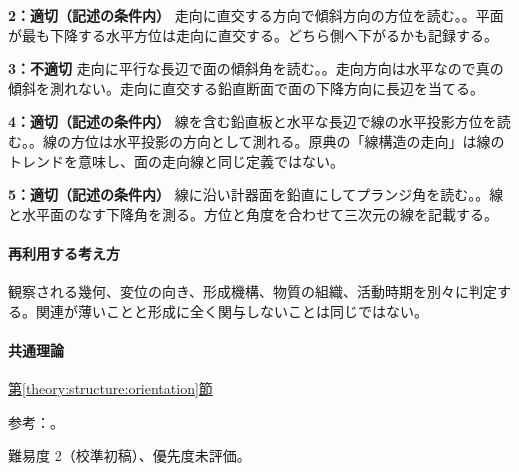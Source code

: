 \noindent\textbf{2：適切（記述の条件内）} 走向に直交する方向で傾斜方向の方位を読む。。平面が最も下降する水平方位は走向に直交する。どちら側へ下がるかも記録する。\par

\noindent\textbf{3：不適切} 走向に平行な長辺で面の傾斜角を読む。。走向方向は水平なので真の傾斜を測れない。走向に直交する鉛直断面で面の下降方向に長辺を当てる。\par

\noindent\textbf{4：適切（記述の条件内）} 線を含む鉛直板と水平な長辺で線の水平投影方位を読む。。線の方位は水平投影の方向として測れる。原典の「線構造の走向」は線のトレンドを意味し、面の走向線と同じ定義ではない。\par

\noindent\textbf{5：適切（記述の条件内）} 線に沿い計器面を鉛直にしてプランジ角を読む。。線と水平面のなす下降角を測る。方位と角度を合わせて三次元の線を記載する。\par

\paragraph{再利用する考え方} 観察される幾何、変位の向き、形成機構、物質の組織、活動時期を別々に判定する。関連が薄いことと形成に全く関与しないことは同じではない。

\paragraph{共通理論} \hyperref[theory:structure:orientation]{第\ref*{theory:structure:orientation}節}

\par 参考：\cite{str_orientation}。

\par 難易度 2（校準初稿）、優先度未評価。
